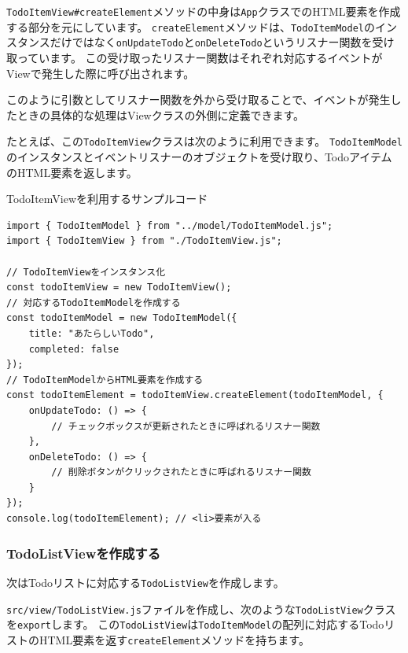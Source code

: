 \texttt{TodoItemView\#createElement}メソッドの中身は\texttt{App}クラスでのHTML要素を作成する部分を元にしています。
\texttt{createElement}メソッドは、\texttt{TodoItemModel}のインスタンスだけではなく\texttt{onUpdateTodo}と\texttt{onDeleteTodo}というリスナー関数を受け取っています。
この受け取ったリスナー関数はそれぞれ対応するイベントがViewで発生した際に呼び出されます。

このように引数としてリスナー関数を外から受け取ることで、イベントが発生したときの具体的な処理はViewクラスの外側に定義できます。

たとえば、この\texttt{TodoItemView}クラスは次のように利用できます。
\texttt{TodoItemModel}のインスタンスとイベントリスナーのオブジェクトを受け取り、TodoアイテムのHTML要素を返します。

\begin{listtitle}
TodoItemViewを利用するサンプルコード
\end{listtitle}
\begin{lstlisting}
import { TodoItemModel } from "../model/TodoItemModel.js";
import { TodoItemView } from "./TodoItemView.js";

// TodoItemViewをインスタンス化
const todoItemView = new TodoItemView();
// 対応するTodoItemModelを作成する
const todoItemModel = new TodoItemModel({
    title: "あたらしいTodo",
    completed: false
});
// TodoItemModelからHTML要素を作成する
const todoItemElement = todoItemView.createElement(todoItemModel, {
    onUpdateTodo: () => {
        // チェックボックスが更新されたときに呼ばれるリスナー関数
    },
    onDeleteTodo: () => {
        // 削除ボタンがクリックされたときに呼ばれるリスナー関数
    }
});
console.log(todoItemElement); // <li>要素が入る
\end{lstlisting}
\listend

\hypertarget{TodoListView}{%
\subsubsection{TodoListViewを作成する}\label{TodoListView}}

次はTodoリストに対応する\texttt{TodoListView}を作成します。

\texttt{src/view/TodoListView.js}ファイルを作成し、次のような\texttt{TodoListView}クラスを\texttt{export}します。
この\texttt{TodoListView}は\texttt{TodoItemModel}の配列に対応するTodoリストのHTML要素を返す\texttt{createElement}メソッドを持ちます。

